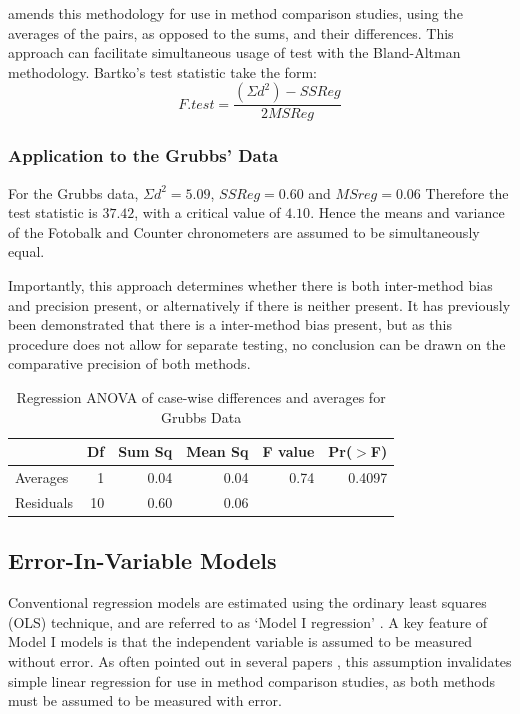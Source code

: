 \documentclass[12pt, a4paper]{report}
\theoremstyle{plain}
\theoremstyle{definition}
\theoremstyle{remark}
\begin{document}
	\citet{Bartko} amends this methodology for use in method
	comparison studies, using the averages of the pairs, as opposed to
	the sums, and their differences. This approach can facilitate
	simultaneous usage of test with the Bland-Altman methodology.
	Bartko's test statistic take the form:
	\[ F.test = \frac{(\Sigma d^{2})-SSReg}{2MSReg}
	\]
	
	
	\subsubsection{Application to the Grubbs' Data}
	For the Grubbs data, $\Sigma d^{2}=5.09 $, $SSReg = 0.60$ and
	$MSreg=0.06$ Therefore the test statistic is $37.42$, with a
	critical value of $4.10$. Hence the means and variance of the
	Fotobalk and Counter chronometers are assumed to be simultaneously
	equal.
	
	Importantly, this approach determines whether there is both
	inter-method bias and precision present, or alternatively if there
	is neither present. It has previously been demonstrated that there
	is a inter-method bias present, but as this procedure does not
	allow for separate testing, no conclusion can be drawn on the
	comparative precision of both methods.
	
	
	
	\begin{table}[ht]
		\begin{center}
			\begin{tabular}{lrrrrr}
				\hline
				& Df & Sum Sq & Mean Sq & F value & Pr($>$F) \\
				\hline
				Averages & 1 & 0.04 & 0.04 & 0.74 & 0.4097 \\
				Residuals & 10 & 0.60 & 0.06 &  &  \\
				\hline
			\end{tabular}
			\caption{Regression ANOVA of case-wise differences and averages
				for Grubbs Data}
		\end{center}
	\end{table}
	
	
	
	
	\subsection{Error-In-Variable Models}
	Conventional regression models are estimated using the ordinary
	least squares (OLS) technique, and are referred to as `Model I
	regression' \citep{CornCoch,ludbrook97}. A key feature of Model I
	models is that the independent variable is assumed to be measured
	without error. As often pointed out in several papers
	\citep{BA83,ludbrook97}, this assumption invalidates simple linear
	regression for use in method comparison studies, as both methods
	must be assumed to be measured with error.
	
\end{document}
